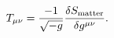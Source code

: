 \begin{equation}\label{peasy_string_stress}
T_{\mu\nu} = {\frac{-1}{\sqrt{-g}}} {\frac{\delta S_{\rm
matter}}{\delta g^{\mu\nu}}}.
\end{equation}

